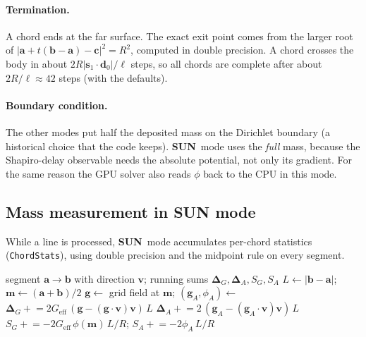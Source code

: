 \documentclass[12pt]{article}
\newcommand{\SUN}{\textcolor{sunc}{\textbf{\textsf{SUN}}}}
\newcommand{\vect}[1]{\mathbf{#1}}
\begin{document}
\paragraph{Termination.}
A chord ends at the far surface. The exact exit point comes from the larger root of
$|\vect a+t(\vect b-\vect a)-\vect c|^2=R^2$, computed in double precision. A
chord crosses the body in about $2R|\vect s_1\cdot\vect d_0|/\ell$ steps, so all
chords are complete after about $2R/\ell\approx42$ steps (with the defaults).

\paragraph{Boundary condition.}
The other modes put half the deposited mass on the Dirichlet boundary (a historical
choice that the code keeps). \SUN\ mode uses the \emph{full} mass, because the
Shapiro-delay observable needs the absolute potential, not only its gradient.
For the same reason the GPU solver also reads $\phi$ back to the CPU in this mode.

\subsection{Mass measurement in SUN mode}
\label{sec:mass}

While a line is processed, \SUN\ mode accumulates per-chord statistics
(\texttt{ChordStats}), using double precision and the midpoint rule on every
segment.

\begin{algorithm}[htbp]
\caption{\textsc{Observe} --- first-order observables along one chord}
\begin{algorithmic}[1]
\Require segment $\vect a\to\vect b$ with direction $\vect v$; running sums $\vect\Delta_G,\vect\Delta_A,S_G,S_A$
\State $L\gets|\vect b-\vect a|$; \quad $\vect m\gets(\vect a+\vect b)/2$
\State $\vect g\gets$ grid field at $\vect m$; \quad $(\vect g_A,\phi_A)\gets$ \Call{BallField}{$\vect m$}
\State $\vect\Delta_G \mathrel{+}= 2G_\text{eff}\,(\vect g-(\vect g\cdot\vect v)\vect v)\,L$ 
\State $\vect\Delta_A \mathrel{+}= 2\,(\vect g_A-(\vect g_A\cdot\vect v)\vect v)\,L$ 
\State $S_G \mathrel{+}= -2G_\text{eff}\,\phi(\vect m)\,L/R$; \quad $S_A \mathrel{+}= -2\phi_A\,L/R$ 
\end{algorithmic}
\end{algorithm}
\end{document}
